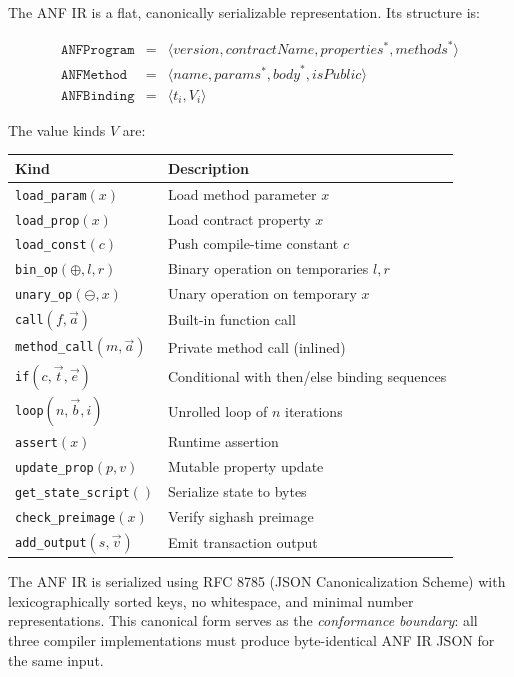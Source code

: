 \documentclass[11pt,a4paper]{article}
\begin{document}
The ANF IR is a flat, canonically serializable representation. Its structure
is:

\[
\begin{array}{rcl}
\texttt{ANFProgram} &=& \langle \textit{version}, \textit{contractName}, \textit{properties}^*, \textit{methods}^* \rangle \\
\texttt{ANFMethod} &=& \langle \textit{name}, \textit{params}^*, \textit{body}^*, \textit{isPublic} \rangle \\
\texttt{ANFBinding} &=& \langle t_i, V_i \rangle
\end{array}
\]

The value kinds $V$ are:

\begin{center}
\small
\begin{tabular}{@{}ll@{}}
\toprule
\textbf{Kind} & \textbf{Description} \\
\midrule
\texttt{load\_param}$(x)$ & Load method parameter $x$ \\
\texttt{load\_prop}$(x)$ & Load contract property $x$ \\
\texttt{load\_const}$(c)$ & Push compile-time constant $c$ \\
\texttt{bin\_op}$(\oplus, l, r)$ & Binary operation on temporaries $l, r$ \\
\texttt{unary\_op}$(\ominus, x)$ & Unary operation on temporary $x$ \\
\texttt{call}$(f, \vec{a})$ & Built-in function call \\
\texttt{method\_call}$(m, \vec{a})$ & Private method call (inlined) \\
\texttt{if}$(c, \vec{t}, \vec{e})$ & Conditional with then/else binding sequences \\
\texttt{loop}$(n, \vec{b}, i)$ & Unrolled loop of $n$ iterations \\
\texttt{assert}$(x)$ & Runtime assertion \\
\texttt{update\_prop}$(p, v)$ & Mutable property update \\
\texttt{get\_state\_script}$ ()$ & Serialize state to bytes \\
\texttt{check\_preimage}$(x)$ & Verify sighash preimage \\
\texttt{add\_output}$(s, \vec{v})$ & Emit transaction output \\
\bottomrule
\end{tabular}
\end{center}

The ANF IR is serialized using RFC 8785 (JSON Canonicalization Scheme)
with lexicographically sorted keys, no whitespace, and minimal number
representations. This canonical form serves as the \emph{conformance
boundary}: all three compiler implementations must produce byte-identical
ANF IR JSON for the same input.
\end{document}
